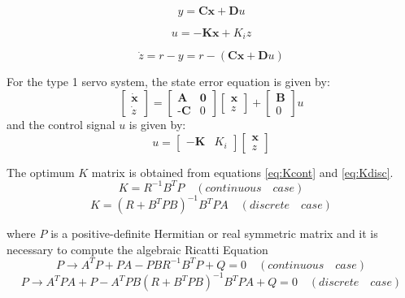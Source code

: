 \begin{equation}
y = \textbf{C}\textbf{x} + \textbf{D}u
\end{equation}

\begin{equation}
u = - \textbf{K}\textbf{x} + K_i z
\end{equation}

\begin{equation}
\dot{z} = r - y = r - (\textbf{C}\textbf{x} + \textbf{D}u)
\end{equation}

For the type 1 servo system, the state error equation is given by:
\begin{equation}
\begin{bmatrix}
\dot{\textbf{x}}\\
\dot{z}
\end{bmatrix} = 
\begin{bmatrix}
\textbf{A} & \textbf{0}\\
\textbf{-C} & 0
\end{bmatrix}
\begin{bmatrix}
\textbf{x}\\
z
\end{bmatrix} + 
\begin{bmatrix}
\textbf{B}\\
0
\end{bmatrix}
u
\end{equation}
and the control signal $u$ is given by:
\begin{equation}
u = \begin{bmatrix}
-\textbf{K} & K_i
\end{bmatrix}
\begin{bmatrix}
\textbf{x}\\
z
\end{bmatrix}
\end{equation}

The optimum $K$ matrix is obtained from equations \ref{eq:Kcont} and \ref{eq:Kdisc}.
\begin{equation}
K = R^{-1}B^{T}P \quad (continuous \quad case)
\label{eq:Kcont}
\end{equation}
\begin{equation}
K = (R + B^{T}PB)^{-1}B^{T}PA \quad (discrete \quad case)
\label{eq:Kdisc}
\end{equation}

where $P$ is a positive-definite Hermitian or real symmetric matrix and it is necessary to compute the algebraic Ricatti Equation
\begin{equation}
P \rightarrow A^{T}P+PA-PBR^{-1}B^{T}P+Q = 0 \quad (continuous \quad case)
\end{equation}
\begin{equation}
P \rightarrow A^{T}PA+P-A^{T}PB(R+B^{T}PB)^{-1}B^{T}PA+Q = 0 \quad (discrete \quad case)
\end{equation}



